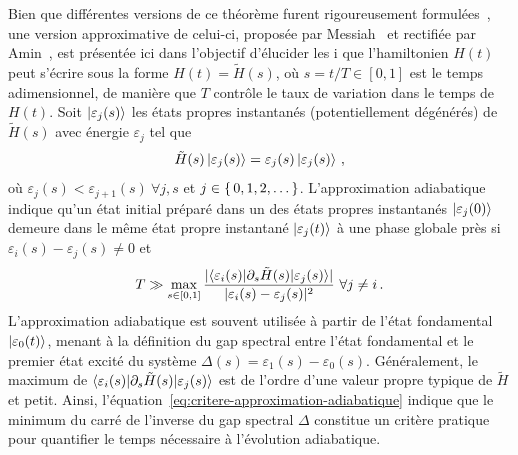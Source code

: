 Bien que différentes versions de ce théorème furent rigoureusement formulées~\cite{albashAdiabaticQuantumComputation2018}, une version approximative de celui-ci, proposée par Messiah~\cite{messiahQuantumMechanics1961} et rectifiée par Amin~\cite{aminConsistencyAdiabaticTheorem2009}, est présentée ici dans l'objectif d'élucider les%
i que l'hamiltonien $H(t)$ peut s'écrire sous la forme $H(t) = \tilde{H}(s)$, où $s=t/T \in [0,1]$ est le temps adimensionnel, de manière que $T$ contrôle le taux de variation dans le temps de $H(t)$. Soit $\ket{\varepsilon_{j} (s)}$ les états propres instantanés (potentiellement dégénérés) de $\tilde{H}(s)$ avec énergie $\varepsilon_{j}$ tel que
\begin{equation}
   \tilde{H}(s) \ket{\varepsilon_{j}(s)} = \varepsilon_{j}(s) \ket{\varepsilon_{j}(s)} \,,
\end{equation}
où $\varepsilon_{j}(s) < \varepsilon_{j+1}(s) \ \forall j,s$ et $j \in \set{ 0, 1, 2, \dots }$. L'approximation adiabatique indique qu'un état initial préparé dans un des états propres instantanés $\ket{\varepsilon_{j}(0)}$ demeure dans le même état propre instantané $\ket{\varepsilon_{j}(t)}$ à une phase globale près si $\varepsilon_{i}(s) - \varepsilon_{j}(s) \neq  0$ et
\begin{equation}
    \label{eq:critere-approximation-adiabatique}
    T \gg \max_{s \in [0,1]} \frac{\lvert \braket{ \varepsilon_{i}(s) | \partial_{s} \tilde{H}(s) | \varepsilon_{j}(s) } \rvert }{\lvert \varepsilon_{i}(s) - \varepsilon_{j}(s) \rvert^{2} } \ \forall j \neq i \,.
\end{equation}
L'approximation adiabatique est souvent utilisée à partir de l'état fondamental $\ket{\varepsilon_{0}(t)}$, menant à la définition du gap spectral entre l'état fondamental et le premier état excité du système $\Delta(s) = \varepsilon_{1}(s) - \varepsilon_{0}(s)$. Généralement, le maximum de $\braket{ \varepsilon_{i}(s) | \partial_{s} \tilde{H}(s) | \varepsilon_{j}(s)}$ est de l'ordre d'une valeur propre typique de $\tilde{H}$ et petit. Ainsi, l'équation~\ref{eq:critere-approximation-adiabatique} indique que le minimum du carré de l'inverse du gap spectral $\Delta$ constitue un critère pratique pour quantifier le temps nécessaire à l'évolution adiabatique.

